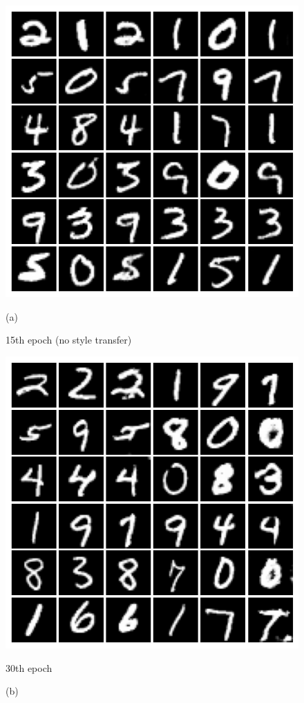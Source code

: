 \documentclass{article}
\begin{document}
\begin{figure}[hbt]
	\centering
	\begin{minipage}{.5\textwidth}
		\centering
		\includegraphics[width=.8\linewidth]{images/mnist_transfer_crisp_15.png}
		\caption{(a)}{15th epoch (no style transfer)}
		\label{fig:sub5}
	\end{minipage}%
	\begin{minipage}{.5\textwidth}
		\centering
		\includegraphics[width=.8\linewidth]{images/mnist_transfer_crisp_30.png}
		\caption{(b)}{30th epoch}
		\label{fig:sub6}
	\end{minipage}
\end{figure}
\end{document}

